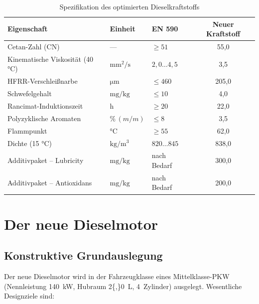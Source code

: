 ﻿\documentclass[12pt,a4paper]{article}
\begin{document}
\begin{table}[H]
  \centering
  \caption{Spezifikation des optimierten Dieselkraftstoffs}
  \label{tab:kraftstoff_spec}
  \begin{tabular}{lllS[table-format=3.1]}
    \toprule
    Eigenschaft & Einheit & EN 590 & {Neuer Kraftstoff} \\
    \midrule
    Cetan-Zahl (CN) & --- & $\geq 51$ & 55{,}0 \\
    Kinematische Viskosität (40 °C) & $\si{\mm\squared\per\s}$ & $2{,}0\ldots 4{,}5$ & 3{,}5 \\
    HFRR-Verschlei\ss{}narbe & $\si{\micro\m}$ & $\leq 460$ & 205{,}0 \\
    Schwefelgehalt & $\si{\mg\per\kg}$ & $\leq 10$ & 4{,}0 \\
    Rancimat-Induktionszeit & $\si{\hour}$ & $\geq 20$ & 22{,}0 \\
    Polyzyklische Aromaten & $\si{\percent\,(m/m)}$ & $\leq 8$ & 3{,}5 \\
    Flammpunkt & $\si{\celsius}$ & $\geq 55$ & 62{,}0 \\
    Dichte (15 °C) & $\si{\kg\per\m\cubed}$ & $820\ldots 845$ & 838{,}0 \\
    Additivpaket -- Lubricity & $\si{\mg\per\kg}$ & nach Bedarf & 300{,}0 \\
    Additivpaket -- Antioxidans & $\si{\mg\per\kg}$ & nach Bedarf & 200{,}0 \\
    \bottomrule
  \end{tabular}
\end{table}

\section{Der neue Dieselmotor}
\label{sec:motor}

\subsection{Konstruktive Grundauslegung}
\label{sec:motor_auslegung}

Der neue Dieselmotor wird in der Fahrzeugklasse eines Mittelklasse-PKW
(Nennleistung \SI{140}{\kW}, Hubraum \SI{2{,}0}{\liter}, 4~Zylinder)
ausgelegt. Wesentliche Designziele sind:
\end{document}
